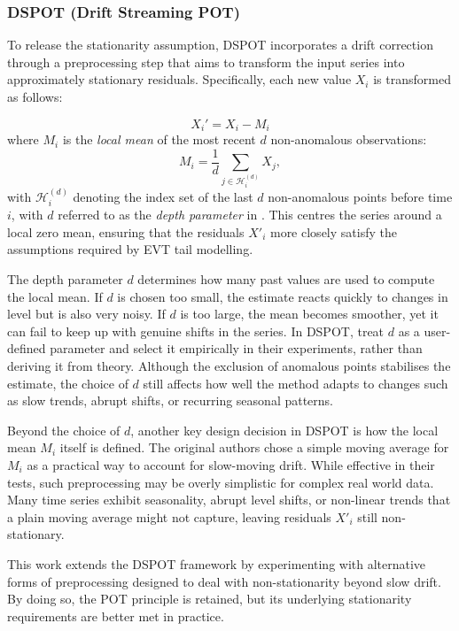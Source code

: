 \documentclass{statsmsc}
\begin{document}
\subsubsection{DSPOT (Drift Streaming POT)}\label{subsec:dspot}

To release the stationarity assumption, 
DSPOT incorporates a drift correction through a preprocessing step that aims to 
transform the input series into approximately stationary residuals. 
Specifically, each new value \( X_i \) is transformed as follows:

\[
X_i' = X_i - M_i
\]
where \( M_i \) is the \emph{local mean} of the most recent \(d\) non-anomalous observations:
\[
M_i = \frac{1}{d}\sum_{j \in \mathcal{H}_i^{(d)}} X_j, 
\]
with \(\mathcal{H}_i^{(d)}\) denoting the index set of the last \(d\) non-anomalous points before time \(i\),
with \(d\) referred to as the \emph{depth parameter} in \citet{siffer2017anomaly}. 
This centres the series around a local zero mean, ensuring that the residuals \(X'_i\) more closely 
satisfy the assumptions required by EVT tail modelling.

The depth parameter \( d \) determines how many past values are used to compute the local mean. If \( d \) is 
chosen too small, the estimate reacts quickly to changes in level but is also very noisy. If \( d \) is too large,
the mean becomes smoother, yet it can fail to keep up with genuine shifts in the series. In DSPOT, \citet{siffer2017anomaly}
treat \( d \) as a user-defined parameter and select it empirically in their experiments, rather than deriving it from 
theory. Although the exclusion of anomalous points stabilises the estimate, the choice of \( d \) still affects how well 
the method adapts to changes such as slow trends, abrupt shifts, or recurring seasonal patterns. 

Beyond the choice of \(d\), another key design decision in DSPOT is how the local mean \(M_i\) itself is defined. 
The original authors chose a simple moving average for \( M_i \) as a practical way 
to account for slow-moving drift. While effective in their tests, such preprocessing 
may be overly simplistic for complex real world data. Many time series exhibit seasonality, 
abrupt level shifts, or non-linear trends that a plain moving average might not capture, 
leaving residuals \( X'_i \) still non-stationary. 

This work extends the DSPOT framework by experimenting with alternative forms of preprocessing designed 
to deal with non-stationarity beyond slow drift. By doing so, the POT principle is retained, but its underlying
stationarity requirements are better met in practice.
\end{document}
